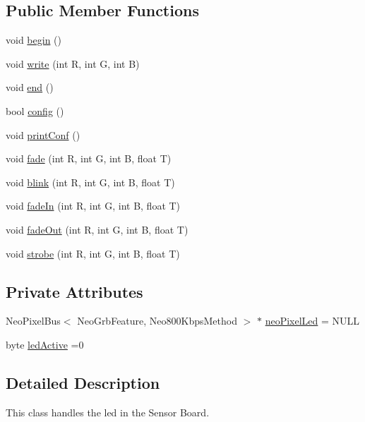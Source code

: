 \subsection*{Public Member Functions}
\begin{DoxyCompactItemize}
\item 
void \hyperlink{classCoolBoardLed_ae3cbde8affcc6f011cbd698c8ef911f6}{begin} ()
\item 
void \hyperlink{classCoolBoardLed_a30fadd4cbec17ceea428bf7a32207e87}{write} (int R, int G, int B)
\item 
void \hyperlink{classCoolBoardLed_a69f323359e0c9f797422f2152b5d41ef}{end} ()
\item 
bool \hyperlink{classCoolBoardLed_a1b60e5e30bea96c49ed62ed1bf1ffc8b}{config} ()
\item 
void \hyperlink{classCoolBoardLed_a8ed3053a36f0ed4a131f43b5b17efb61}{print\+Conf} ()
\item 
void \hyperlink{classCoolBoardLed_af1cacbaa88db8bcf6042c1083ba41155}{fade} (int R, int G, int B, float T)
\item 
void \hyperlink{classCoolBoardLed_a96e1ea13003eee34c9dbcef340404426}{blink} (int R, int G, int B, float T)
\item 
void \hyperlink{classCoolBoardLed_ab778f5e7bed0ab74e3906d82110493c3}{fade\+In} (int R, int G, int B, float T)
\item 
void \hyperlink{classCoolBoardLed_a93d545679237e8cc858324367149775c}{fade\+Out} (int R, int G, int B, float T)
\item 
void \hyperlink{classCoolBoardLed_ad5f0de4c628cbfbf49896042831c64ad}{strobe} (int R, int G, int B, float T)
\end{DoxyCompactItemize}
\subsection*{Private Attributes}
\begin{DoxyCompactItemize}
\item 
Neo\+Pixel\+Bus$<$ Neo\+Grb\+Feature, Neo800\+Kbps\+Method $>$ $\ast$ \hyperlink{classCoolBoardLed_ac2c13fa462a010cd9242bf297c013923}{neo\+Pixel\+Led} = N\+U\+LL
\item 
byte \hyperlink{classCoolBoardLed_a5f17c135516fcf4b44ea8a096ba0177a}{led\+Active} =0
\end{DoxyCompactItemize}


\subsection{Detailed Description}
This class handles the led in the Sensor Board. 

